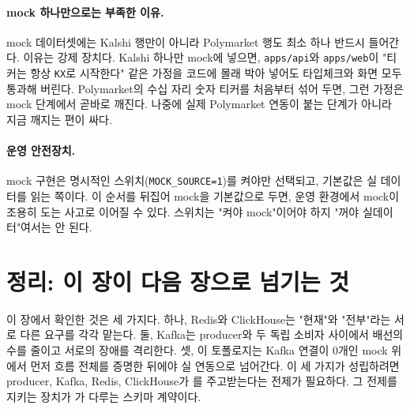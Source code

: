 \paragraph{mock 하나만으로는 부족한 이유.} mock 데이터셋에는 Kalshi 행만이 아니라
Polymarket 행도 최소 하나 반드시 들어간다. 이유는 강제 장치다. Kalshi 하나만 mock에
넣으면, \texttt{apps/api}와 \texttt{apps/web}이 "티커는 항상 \texttt{KX}로 시작한다"
같은 가정을 코드에 몰래 박아 넣어도 타입체크와 화면 모두 통과해 버린다. Polymarket의
수십 자리 숫자 티커를 처음부터 섞어 두면, 그런 가정은 mock 단계에서 곧바로 깨진다. 나중에 실제 Polymarket 연동이 붙는 단계가 아니라 지금 깨지는 편이 싸다.

\paragraph{운영 안전장치.} mock 구현은 명시적인 스위치(\texttt{MOCK\_SOURCE=1})를 켜야만
선택되고, 기본값은 실 데이터를 읽는 쪽이다. 이 순서를 뒤집어 mock을 기본값으로 두면,
운영 환경에서 mock이 조용히 도는 사고로 이어질 수 있다. 스위치는 "켜야 mock"이어야
하지 "꺼야 실데이터"여서는 안 된다.

\section{정리: 이 장이 다음 장으로 넘기는 것}
\label{sec:arch-summary}

이 장에서 확인한 것은 세 가지다. 하나, Redis와 ClickHouse는 "현재"와 "전부"라는
서로 다른 요구를 각각 맡는다. 둘, Kafka는 producer와 두 독립 소비자 사이에서
배선의 수를 줄이고 서로의 장애를 격리한다. 셋, 이 토폴로지는 Kafka 연결이 0개인
mock 위에서 먼저 흐름 전체를 증명한 뒤에야 실 연동으로 넘어간다. 이 세 가지가
성립하려면 producer, Kafka, Redis, ClickHouse가 를 주고받는다는
전제가 필요하다. 그 전제를 지키는 장치가 가 다루는 스키마 계약이다.
